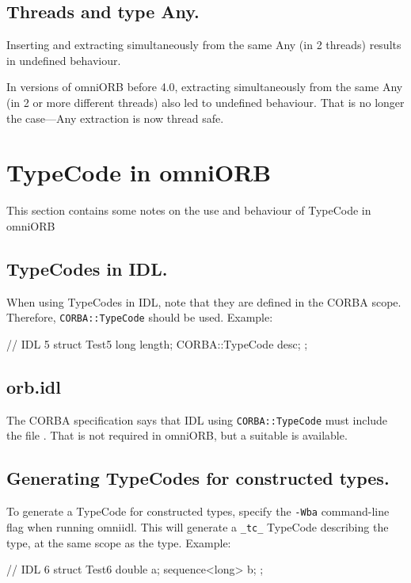 \documentclass[11pt,twoside,a4paper]{book}
\newcommand{\type}[1]{\texttt{#1}}
\newcommand{\code}[1]{\texttt{#1}}
\newcommand{\file}{\begingroup \urlstyle{tt}\Url}
\begin{document}
\subsection{Threads and type Any.}
Inserting and extracting simultaneously from the same Any (in 2
threads) results in undefined behaviour.

In versions of omniORB before 4.0, extracting simultaneously from the
same Any (in 2 or more different threads) also led to undefined
behaviour. That is no longer the case---Any extraction is now thread
safe.


\section{TypeCode in omniORB}

This section contains some notes on the use and behaviour of TypeCode
in omniORB

\subsection{TypeCodes in IDL.}

When using TypeCodes in IDL, note that they are defined in the CORBA
scope.  Therefore, \type{CORBA::TypeCode} should be used. Example:

\begin{idllisting}
// IDL 5
struct Test5 {
  long length;
  CORBA::TypeCode desc;
};
\end{idllisting}

\subsection{orb.idl}

The CORBA specification says that IDL using \type{CORBA::TypeCode}
must include the file \file{orb.idl}. That is not required in omniORB,
but a suitable \file{orb.idl} is available.


\subsection{Generating TypeCodes for constructed types.}

To generate a TypeCode for constructed types, specify the
\texttt{-Wba} command-line flag when running omniidl. This will
generate a \code{\_tc\_} TypeCode describing the type, at the same
scope as the type. Example:

\begin{idllisting}
// IDL 6
struct Test6 {
  double a;
  sequence<long> b;
};
\end{idllisting}
\end{document}
